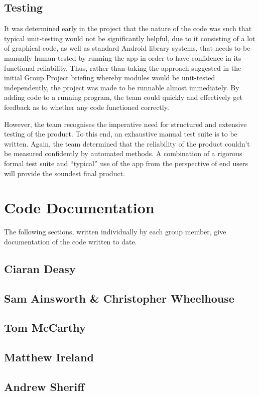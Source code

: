 \documentclass[12pt,a4paper,twoside]{article}
\begin{document}
\subsection{Testing}

It was determined early in the project that the nature of the code was such that typical unit-testing would not be significantly helpful, due to it consisting of a lot of graphical code, as well as standard Android library systems, that needs to be manually human-tested by running the app in order to have confidence in its functional reliability. Thus, rather than taking the approach suggested in the initial Group Project briefing whereby modules would be unit-tested independently, the project was made to be runnable almost immediately. By adding code to a running program, the team could quickly and effectively get feedback as to whether any code functioned correctly.

However, the team recognises the imperative need for structured and extensive testing of the product. To this end, an exhaustive manual test suite is to be written. Again, the team determined that the reliability of the product couldn't be measured confidently by automated methods. A combination of a rigorous formal test suite and ``typical'' use of the app from the perspective of end users will provide the soundest final product.

\section{Code Documentation}

The following sections, written individually by each group member, give documentation of the code written to date.

\subsection{Ciaran Deasy}

\subsection{Sam Ainsworth \& Christopher Wheelhouse}

\subsection{Tom McCarthy}

\subsection{Matthew Ireland}

\subsection{Andrew Sheriff}
\end{document}
